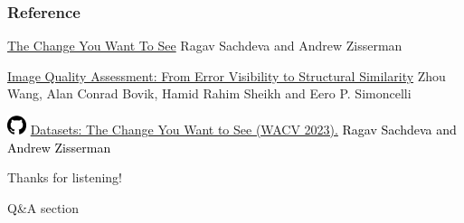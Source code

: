 \documentclass[13.5pt,aspecratio=169, xcolor=dvipsnames]{beamer}
\begin{document}
\begin{frame}
\begin{figure}
\begin{subfigure}{0.5\textwidth}
              \captionsetup{labelformat=empty}
            \end{subfigure}
            \captionsetup{labelformat=empty}
        \end{figure}

    \end{frame}






\onehalfspacing
\begin{frame} %
	\frametitle{Reference}
	
	\begin{thebibliography}{99} %
		\footnotesize %
		
			\href{https://arxiv.org/pdf/2209.14341.pdf}{The Change You Want To See}
			\newblock Ragav Sachdeva and Andrew Zisserman

        \href{https://www.cns.nyu.edu/pub/eero/wang03-reprint.pdf}{Image Quality Assessment: From Error Visibility to
        Structural Similarity}
			\newblock Zhou Wang, Alan Conrad Bovik, Hamid Rahim Sheikh and Eero P. Simoncelli
		
        \hspace{-1.9em}\includegraphics[width=1.5em]{Icons/github.png}
        \textcolor{blue}{\href{https://github.com/ragavsachdeva/The-Change-You-Want-to-See/tree/main?fbclid=IwAR0LKUHmVIEYSDTCgl2KeV5jir1pUlMSYJTbHbirilqWH_eZ4N9FxHwTQto\#datasets}{Datasets: The Change You Want to See (WACV 2023).}}
          \newblock \textcolor{black}{Ragav Sachdeva and Andrew Zisserman}
	\end{thebibliography}
\end{frame}




\begin{frame} %
	\begin{center}
		{\Huge Thanks for listening!}
		
		\bigskip\bigskip %
		
		{\LARGE Q\&A section}
	\end{center}
\end{frame}
\end{document}
